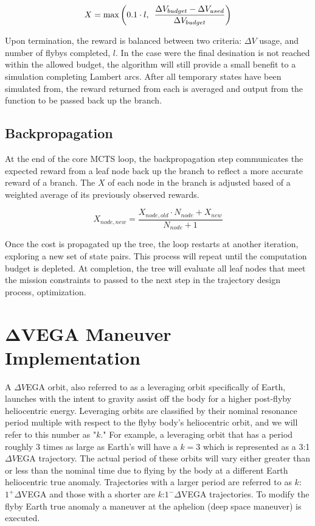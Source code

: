 \documentclass[letterpaper, preprint, paper,11pt]{AAS}	%
\begin{document}
\begin{equation}
    \label{eq:simCost1}
    X = \text{max}\left( 0.1 \cdot l,\hspace{0.5em} \frac{\Delta V_{budget} - \Delta V_{used}}{\Delta V_{budget}} \right)
\end{equation}

Upon termination, the reward is balanced between two criteria: $\Delta V$ usage, and number of flybys completed, $l$. In the case were the final desination is not reached within the allowed budget, the algorithm will still provide a small benefit to a simulation completing Lambert arcs. After all temporary states have been simulated from, the reward returned from each is averaged and output from the function to be passed back up the branch.

\subsection{Backpropagation}

At the end of the core MCTS loop, the backpropagation step communicates the expected reward from a leaf node back up the branch to reflect a more accurate reward of a branch. The $X$ of each node in the branch is adjusted based of a weighted average of its previously observed rewards. 

\begin{equation}
    \label{eq:bp}
    X_{node, new} = \frac{X_{node, old} \cdot N_{node} + X_{new}}{N_{node} + 1}
\end{equation}

Once the cost is propagated up the tree, the loop restarts at another iteration, exploring a new set of state pairs. This process will repeat until the computation budget is depleted. At completion, the tree will evaluate all leaf nodes that meet the mission constraints to passed to the next step in the trajectory design process, optimization.

\section{$\boldsymbol{\Delta V}$EGA Maneuver Implementation}

A $\Delta V$EGA orbit, also referred to as a leveraging orbit specifically of Earth, launches with the intent to gravity assist off the body for a higher post-flyby heliocentric energy\cite{Hollenbeck}.  Leveraging orbits are classified by their nominal resonance period multiple with respect to the flyby body's heliocentric orbit, and we will refer to this number as "$k$." For example, a leveraging orbit that has a period roughly 3 times as large as Earth's will have a $k=3$ which is represented as a 3:1 $\Delta V$EGA trajectory. The actual period of these orbits will vary either greater than or less than the nominal time due to flying by the body at a different Earth heliocentric true anomaly. Trajectories with a larger period are referred to as $k$:$1^{+} \Delta$VEGA and those with a shorter are $k$:$1^{-} \Delta$VEGA trajectories. To modify the flyby Earth true anomaly a maneuver at the aphelion (deep space maneuver) is executed.
\end{document}
